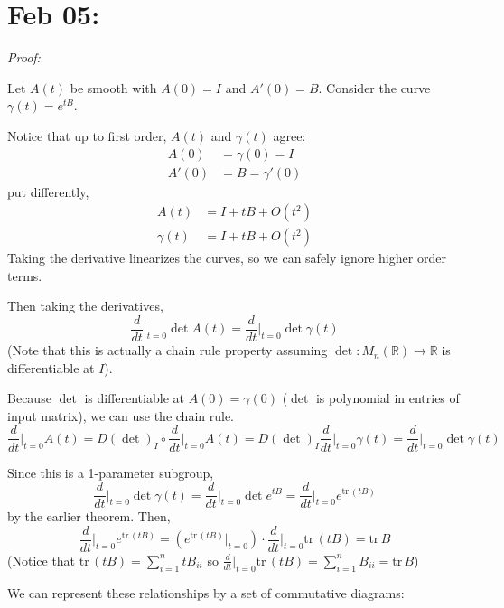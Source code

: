 \documentclass[12pt]{article}
\newcommand{\R}{\mathbb{R}}
\newcommand{\GL}{\text{GL}}
\newcommand{\tr}{\text{tr}\,}
\newenvironment*{tbox}[2][gray]{
    \begin{tcolorbox}[
        parbox=false,
        colback=#1!5!white,
        colframe=#1!75!black,
        breakable,
        title={#2}
    ]}
    {\end{tcolorbox}}
\begin{document}
\section{Feb 05:}
    \begin{tbox}{\textbf{Theorem:} Let $A(t)$ be a smooth family of matrices in $\GL(2, \R)$ and $A(0) = I$. Then 
        \[\frac{d}{dt}\bigg\vert_{t =0 } \det A(t) = \tr A'(0)\]}
        \emph{Proof:} 

        Let $A(t)$ be smooth with $A(0) = I$ and $A'(0) = B$. Consider the curve $\gamma(t) = e^{tB}$.

        Notice that up to first order, $A(t)$ and $\gamma(t)$ agree:
        \begin{align*}
            A(0) &= \gamma(0) = I\\ 
            A'(0) &= B = \gamma'(0)
        \end{align*} 
        put differently,
        \begin{align*}
            A(t) &= I + tB + O(t^2)\\ 
            \gamma(t) &= I + tB + O(t^2)
        \end{align*}
        Taking the derivative linearizes the curves, so we can safely ignore higher order terms. 

        Then taking the derivatives, 
        \[\frac{d}{dt}\bigg\vert_{t=0} \det A(t) = \frac{d}{dt}\bigg\vert_{t=0} \det \gamma(t)\]
        (Note that this is actually a chain rule property assuming $\det: M_n(\R) \to \R$ is differentiable at $I$). 

        Because $\det$ is differentiable at $A(0) = \gamma(0)$ ($\det$ is polynomial in entries of input matrix), we can use the chain rule. 
        \[\frac{d}{dt}\bigg\vert_{t=0} A(t) = D(\det)_{I} \circ \frac{d}{dt}\bigg\vert_{t=0} A(t) = D(\det)_I \frac{d}{dt}\bigg\vert_{t=0} \gamma(t) = \frac{d}{dt}\bigg\vert_{t=0} \det \gamma(t)\]

        Since this is a 1-parameter subgroup, 
        \[\frac{d}{dt}\bigg\vert_{t=0} \det \gamma(t) = \frac{d}{dt}\bigg\vert_{t=0} \det e^{tB} = \frac{d}{dt}\bigg\vert_{t=0} e^{\tr(tB)}\]
        by the earlier theorem. Then, 
        \[\frac{d}{dt}\bigg\vert_{t=0} e^{\tr(tB)} = (e^{\tr(tB)} \bigg\vert_{t=0}) \cdot \frac{d}{dt}\bigg\vert_{t=0} \tr(tB) = \tr B \]
        (Notice that $\tr(tB) = \sum_{i=1}^n tB_{ii}$ so $\frac{d}{dt}\bigg\vert_{t=0} \tr(tB) = \sum_{i=1}^n B_{ii} = \tr B$)
    \end{tbox}

    We can represent these relationships by a set of commutative diagrams:
    
\end{document}
